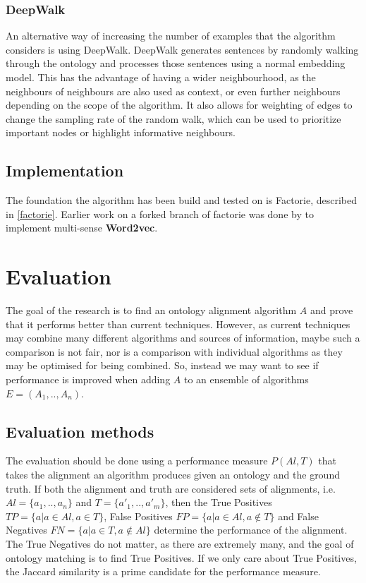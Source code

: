 \documentclass{article}
\begin{document}
 \subsubsection{DeepWalk}
  An alternative way of increasing the number of examples that the algorithm considers is using DeepWalk. DeepWalk generates sentences by randomly walking through the ontology and processes those sentences using a normal embedding model. This has the advantage of having a wider neighbourhood, as the neighbours of neighbours are also used as context, or even further neighbours depending on the scope of the algorithm. It also allows for weighting of edges to change the sampling rate of the random walk, which can be used to prioritize important nodes or highlight informative neighbours.

  
 \subsection{Implementation}
 The foundation the algorithm has been build and tested on is Factorie, described in \ref{factorie}. Earlier work on a forked branch of factorie was done by \cite{multisensecode} to implement multi-sense \textbf{Word2vec}.
 
 \newpage
 \section{Evaluation}
 The goal of the research is to find an ontology alignment algorithm $A$ and prove that it performs better than current techniques. However, as current techniques may combine many different algorithms and sources of information, maybe such a comparison is not fair, nor is a comparison with individual algorithms as they may be optimised for being combined. So, instead we may want to see if performance is improved when adding $A$ to an ensemble of algorithms $E=(A_1,..,A_n)$.
 \subsection{Evaluation methods} \label{Evaluation methods}
 The evaluation should be done using a performance measure $P(Al,T)$ that takes the alignment an algorithm produces given an ontology and the ground truth. If both the alignment and truth are considered sets of alignments, i.e. $Al=\{a_1,..,a_n\}$ and $T=\{a'_1,..,a'_m\}$, then the True Positives $TP=\{a|a\in Al, a\in T\}$, False Positives $FP=\{a|a\in Al, a\notin T\}$ and False Negatives $FN=\{a|a\in T, a\notin Al\}$ determine the performance of the alignment. The True Negatives do not matter, as there are extremely many, and the goal of ontology matching is to find True Positives. If we only care about True Positives, the Jaccard similarity is a prime candidate for the performance measure.
 
\end{document}
